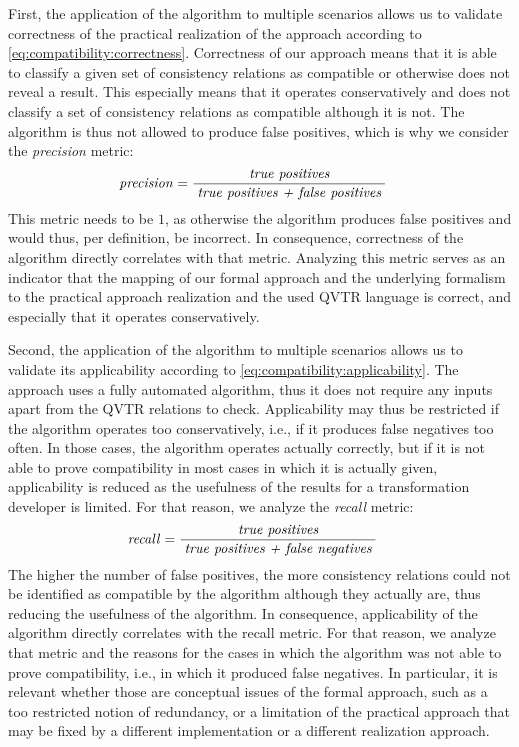 First, the application of the algorithm to multiple scenarios allows us to validate correctness of the practical realization of the approach according to \autoref{eq:compatibility:correctness}.
Correctness of our approach means that it is able to classify a given set of consistency relations as compatible or otherwise does not reveal a result.
This especially means that it operates conservatively and does not classify a set of consistency relations as compatible although it is not.
The algorithm is thus not allowed to produce false positives, which is why we consider the \emph{precision} metric:
\begin{align*}
    &
    \mathit{precision} = \frac{\; \textit{true positives} \;}{\; \textit{true positives + false positives} \;}
\end{align*}
This metric needs to be $1$, as otherwise the algorithm produces false positives and would thus, per definition, be incorrect.
In consequence, correctness of the algorithm directly correlates with that metric.
Analyzing this metric serves as an indicator that the mapping of our formal approach and the underlying formalism to the practical approach realization and the used \gls{QVTR} language is correct, and especially that it operates conservatively.

Second, the application of the algorithm to multiple scenarios allows us to validate its applicability according to \autoref{eq:compatibility:applicability}.
The approach uses a fully automated algorithm, thus it does not require any inputs apart from the \gls{QVTR} relations to check.
Applicability may thus be restricted if the algorithm operates too conservatively, i.e., if it produces false negatives too often.
In those cases, the algorithm operates actually correctly, but if it is not able to prove compatibility in most cases in which it is actually given, applicability is reduced as the usefulness of the results for a transformation developer is limited.
For that reason, we analyze the \emph{recall} metric:
\begin{align*}
    &
    \mathit{recall} = \frac{\; \textit{true positives} \;}{\; \textit{true positives + false negatives} \;}
\end{align*}
The higher the number of false positives, the more consistency relations could not be identified as compatible by the algorithm although they actually are, thus reducing the usefulness of the algorithm.
In consequence, applicability of the algorithm directly correlates with the recall metric.
For that reason, we analyze that metric and the reasons for the cases in which the algorithm was not able to 
prove compatibility, i.e., in which it produced false negatives.
In particular, it is relevant whether those are conceptual issues of the formal approach, such as a too restricted notion of redundancy, or a limitation of the practical approach that may be fixed by a different implementation or a different realization approach.


